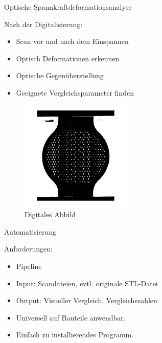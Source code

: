 \documentclass[../slides.tex]{subfiles}
\begin{document}
\begin{frame}{Optische Spannkraftdeformationsanalyse}
    \begin{minipage}[t]{.39\textwidth}
        \begin{block}{Nach der Digitalisierung:}
            \begin{itemize}
                \item Scan vor und nach dem Einspannen
                \item Optisch Deformationen erkennen
                \item Optische Gegenüberstellung
                \item Geeignete Vergleichsparameter finden
            \end{itemize}
        \end{block}
    \end{minipage}
    \hfill
    \begin{minipage}[t]{.6\textwidth}
      \begin{figure}[]
        \includegraphics[height=150pt]{img_niklas/stichted.png}
        \caption[short]{Digitales Abbild}
      \end{figure}
    \end{minipage}
  \end{frame}

  \begin{frame}{Automatisierung}
    \begin{minipage}[h]{.8\textwidth}
        \begin{block}{Anforderungen:}
            \begin{itemize}
                \item Pipeline  
                \item Input: Scandateien, evtl. originale STL-Datei
                \item Output: Visueller Vergleich, Vergleichszahlen
                \item Universell auf Bauteile anwendbar.
                \item Einfach zu installierendes Programm.
            \end{itemize}
        \end{block}
    \end{minipage}
    \hfill  
    \begin{minipage}[h]{.19\textwidth}
      
    \end{minipage}
  \end{frame}
\end{document}
